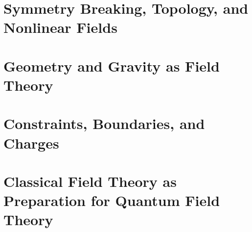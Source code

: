 \documentclass[11pt,a4paper]{report}
\begin{document}
\hypersetup{pageanchor=false}

\clearpage
\hypersetup{pageanchor=true}
\setcounter{tocdepth}{1}
\tableofcontents

\clearpage
{}



\part{Symmetry Breaking, Topology, and Nonlinear Fields}




\part{Geometry and Gravity as Field Theory}




\part{Constraints, Boundaries, and Charges}




\part{Classical Field Theory as Preparation for Quantum Field Theory}




\appendix







\clearpage
\listoffigures
\end{document}
